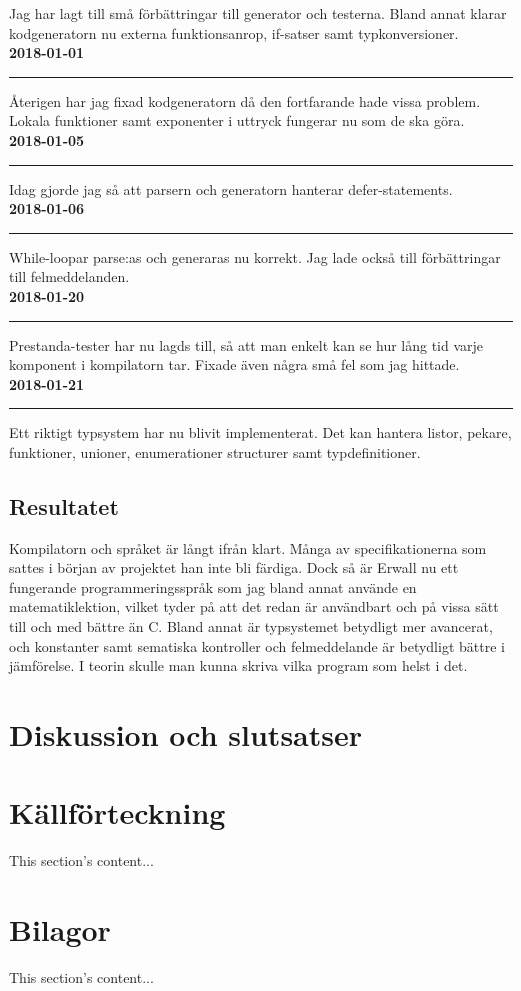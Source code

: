 \documentclass{theme}
\begin{document}
\noindent 
Jag har lagt till små förbättringar till generator och testerna. Bland annat 
klarar kodgeneratorn nu externa funktionsanrop, if-satser samt typkonversioner. 
\\

\noindent\textbf{2018-01-01}\\
\noindent\rule{\textwidth}{1pt}

\noindent 
Återigen har jag fixad kodgeneratorn då den fortfarande hade vissa problem. 
Lokala funktioner samt exponenter i uttryck fungerar nu som de ska göra.\\

\noindent\textbf{2018-01-05}\\
\noindent\rule{\textwidth}{1pt}

\noindent 
Idag gjorde jag så att parsern och generatorn hanterar defer-statements. \\

\noindent\textbf{2018-01-06}\\
\noindent\rule{\textwidth}{1pt}

\noindent 
While-loopar parse:as och generaras nu korrekt. Jag lade också till 
förbättringar till felmeddelanden.\\

\noindent\textbf{2018-01-20}\\
\noindent\rule{\textwidth}{1pt}

\noindent 
Prestanda-tester har nu lagds till, så att man enkelt kan se hur lång tid varje
komponent i kompilatorn tar. Fixade även några små fel som jag hittade.\\

\noindent\textbf{2018-01-21}\\
\noindent\rule{\textwidth}{1pt}

\noindent 
Ett riktigt typsystem har nu blivit implementerat. Det kan hantera listor, 
pekare, funktioner, unioner, enumerationer structurer samt typdefinitioner.\\

\subsection{Resultatet}

Kompilatorn och språket är långt ifrån klart. Många av specifikationerna som 
sattes i början av projektet han inte bli färdiga. Dock så är Erwall nu ett 
fungerande programmeringsspråk som jag bland annat använde en matematiklektion,
vilket tyder på att det redan är användbart och på vissa sätt till och med 
bättre än C. Bland annat är typsystemet betydligt mer avancerat, och konstanter
samt sematiska kontroller och felmeddelande är betydligt bättre i jämförelse. I 
teorin skulle man kunna skriva vilka program som helst i det. 

\section{Diskussion och slutsatser}



\section{Källförteckning}
This section's content...

\section{Bilagor}
This section's content...
\end{document}
